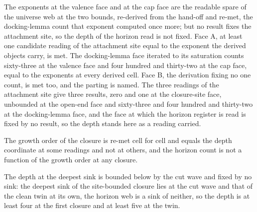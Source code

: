 \begin{chwall}\label{box:X-4-depth-the-growth-order-and-the-termination-wave:3}
The exponents at the valence face and at the cap face are the readable spare of the universe web at the two bounds, re-derived from the hand-off and re-met, the docking-lemma count that exponent computed once more; but no result fixes the attachment site, so the depth of the horizon read is not fixed. Face A, at least one candidate reading of the attachment site equal to the exponent the derived objects carry, is met. The docking-lemma face iterated to its saturation counts sixty-three at the valence face and four hundred and thirty-two at the cap face, equal to the exponents at every derived cell. Face B, the derivation fixing no one count, is met too, and the parting is named. The three readings of the attachment site give three results, zero and one at the closure-site face, unbounded at the open-end face and sixty-three and four hundred and thirty-two at the docking-lemma face, and the face at which the horizon register is read is fixed by no result, so the depth stands here as a reading carried.
\end{chwall}
\begin{chwall}\label{box:X-4-depth-the-growth-order-and-the-termination-wave:4}
The growth order of the closure is re-met cell for cell and equals the depth coordinate at some readings and not at others, and the horizon count is not a function of the growth order at any closure.
\end{chwall}
\begin{chwall}\label{box:X-4-depth-the-growth-order-and-the-termination-wave:5}
The depth at the deepest sink is bounded below by the cut wave and fixed by no sink: the deepest sink of the site-bounded closure lies at the cut wave and that of the clean twin at its own, the horizon web is a sink of neither, so the depth is at least four at the first closure and at least five at the twin.
\end{chwall}
